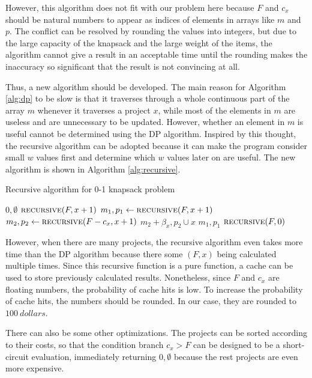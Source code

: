 \documentclass{article}
\begin{document}
However, this algorithm does not fit with our problem here
because $F$ and $c_x$ should be natural numbers to appear as indices of elements in arrays like $m$ and $p$.
The conflict can be resolved by rounding the values into integers,
but due to the large capacity of the knapsack and the large weight of the items,
the algorithm cannot give a result in an acceptable time until the rounding makes the inaccuracy so significant that the result is not convincing at all.

Thus, a new algorithm should be developed.
The main reason for Algorithm \ref{alg:dp} to be slow is that it traverses through a whole continuous part of the array $m$ whenever it traverses a project $x$,
while most of the elements in $m$ are useless and are unnecessary to be updated.
However, whether an element in $m$ is useful cannot be determined using the DP algorithm.
Inspired by this thought, the recursive algorithm can be adopted because it can make the program consider small $w$ values first and determine which $w$ values later on are useful.
The new algorithm is shown in Algorithm \ref{alg:recursive}.

\begin{algorithm}[h!]
\caption{Recursive algorithm for 0-1 knapsack problem}
\label{alg:recursive}
\begin{algorithmic}
	\State\Return$0,\emptyset$
	\State\Return$\Call{recursive}{F,x+1}$
\Else
	\State$m_1,p_1\leftarrow\Call{recursive}{F,x+1}$
	\State$m_2,p_2\leftarrow\Call{recursive}{F-c_x,x+1}$
		\State\Return$m_2+\beta_x,p_2\cup x$
	\Else
		\State\Return$m_1,p_1$
	\EndIf
\EndIf
\EndFunction
{}
\State\Return$\Call{recursive}{F,0}$
\EndFunction
\end{algorithmic}
\end{algorithm}

However, when there are many projects, the recursive algorithm even takes more time than the DP algorithm
because there some $\left(F,x\right)$ being calculated multiple times.
Since this recursive function is a pure function, a cache can be used to store previously calculated results.
Nonetheless, since $F$ and $c_x$ are floating numbers, the probability of cache hits is low.
To increase the probability of cache hits, the numbers should be rounded.
In our case, they are rounded to $\SI{100}{dollars}$.

There can also be some other optimizations.
The projects can be sorted according to their costs, so that the condition branch $c_x>F$ can be designed to be a short-circuit evaluation,
immediately returning $0,\emptyset$ because the rest projects are even more expensive.
\end{document}
